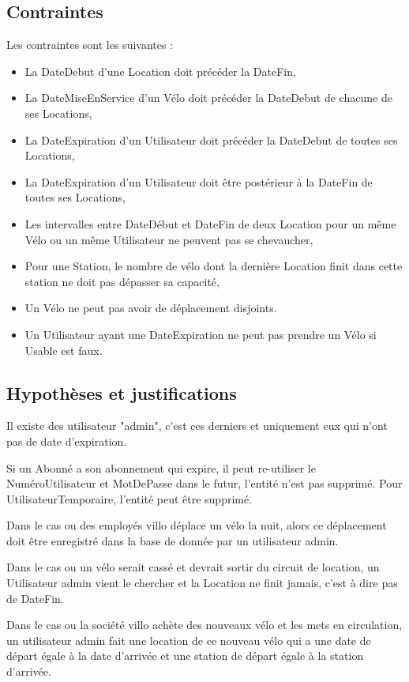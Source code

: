 \documentclass[a4paper,10pt]{article}
\begin{document}
\subsection{Contraintes}
Les contraintes sont les suivantes :
\begin{itemize}
  \item La DateDebut d'une Location doit précéder la DateFin, 
  \item La DateMiseEnService d'un Vélo doit précéder la DateDebut de chacune de ses Locations,
  \item La DateExpiration d'un Utilisateur doit précéder la DateDebut de toutes ses Locations,
  \item La DateExpiration d'un Utilisateur doit \^etre postérieur à la DateFin de toutes ses Locations,
  \item Les intervalles entre DateDébut et DateFin de deux Location pour un même Vélo ou un même Utilisateur ne peuvent pas se chevaucher,
  \item Pour une Station, le nombre de vélo dont la dernière Location finit  dans cette station ne doit pas dépasser sa capacité,
  \item Un Vélo ne peut pas avoir de déplacement disjoints.
  \item Un Utilisateur ayant une DateExpiration ne peut pas prendre un Vélo si Usable est faux.
\end{itemize}
\subsection{Hypothèses et justifications}


Il existe des utilisateur "admin", c'est ces derniers et uniquement eux qui n'ont pas de date d'expiration.

Si un Abonné a son abonnement qui expire, il peut re-utiliser le NuméroUtilisateur et MotDePasse dans le futur, l'entité n'est pas supprimé. Pour UtilisateurTemporaire, l'entité peut être supprimé.

Dans le cas ou des employés villo déplace un vélo la nuit, alors ce déplacement doit être enregistré dans la base de donnée par un utilisateur admin.

Dans le cas ou un vélo serait cassé et devrait sortir du circuit de location, un Utilisateur admin vient le chercher et la Location ne finit jamais, c'est à dire pas de DateFin.

Dans le cas ou la société villo achète des nouveaux vélo et les mets en circulation, un utilisateur admin fait une location de ce nouveau vélo qui a une date de départ égale à la date d'arrivée et une station de départ égale à la station d'arrivée.
\end{document}
